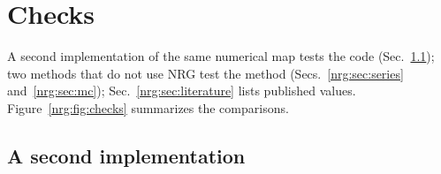 \begin{table}[ht]\centering\small
\caption{$y_t=1-\DE$ near $s=1$ against the leading form $\sqrt{2\delta}$ ($\delta=1-s=2\Ds$) and the next-to-leading form
$\sqrt{2\delta}-\delta/4$ of Refs.~\cite{nrg:BLMV25,nrg:BLMV26}; the remainder in units of $\delta^{3/2}$, and $\dtot$ in the same units (the
uncertainty of the remainder).}\label{nrg:tab:s1}

\end{table}

\section{Checks}\label{nrg:sec:checks}
A second implementation of the same numerical map tests the code (Sec.~\ref{nrg:sec:indep}); two methods that do not use NRG test the
method (Secs.~\ref{nrg:sec:series} and~\ref{nrg:sec:mc}); Sec.~\ref{nrg:sec:literature} lists published values. Figure~\ref{nrg:fig:checks} summarizes
the comparisons.

\subsection{A second implementation}\label{nrg:sec:indep}
